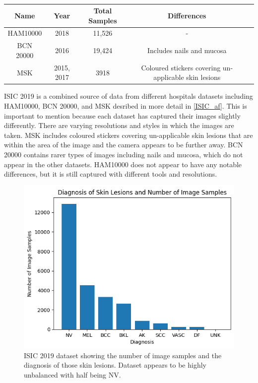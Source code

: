 \begin{table}
	\small
	\begin{tabular}{|c|c|c|c|c|}
		\hline
		Name & Year & Total Samples & Differences \\
		\hline
		HAM10000 & 2018 & 11,526 & -
		\\
		\hline
		BCN 20000 & 2016 & 19,424 & Includes nails and mucosa
		\\
		\hline
		MSK & 2015, 2017 & 3918 & Coloured stickers covering un-applicable skin lesions
		\\
		\hline	
	\end{tabular}
	\caption{}
\end{table} \label{ISIC_AF}

ISIC 2019 is a combined source of data from different hospitals datasets including HAM10000, BCN 20000, and MSK desribed in more detail in \ref{ISIC_af}. This is important to mention because each dataset has captured their images slightly differently. There are varying resolutions and styles in which the images are taken. MSK includes coloured stickers covering un-applicable skin lesions that are within the area of the image and the camera appears to be further away. BCN 20000 contains rarer types of images including nails and mucosa, which do not appear in the other datasets. HAM10000 does not appear to have any notable differences, but it is still captured with different tools and resolutions.

\begin{figure}
	\centering
	\includegraphics[]{images/ISIC/diagnosis-number.png}
	\caption{ISIC 2019 dataset showing the number of image samples and the diagnosis of those skin lesions. Dataset appears to be highly unbalanced with half being NV.} 
\end{figure} \label{diagnosis-number}
	
